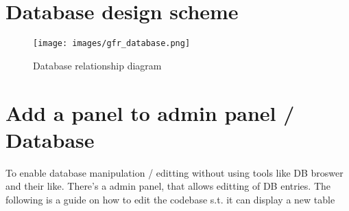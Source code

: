 \documentclass{article}
\begin{document}
\section{Database design scheme}
\begin{figure}[!htb]
	\centering
	\texttt{[image: images/gfr\_database.png]}
	\caption{Database relationship diagram}
\end{figure}

\newpage
\section{Add a panel to admin panel / Database}
To enable database manipulation / editting without using tools like DB broswer and their like. There's a admin panel, that allows editting of DB entries. The following is a guide on how to edit the codebase s.t. it can display a new table
\end{document}
